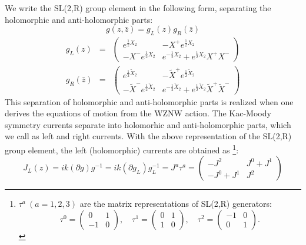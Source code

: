 \documentclass[a4paper,12pt]{article}
\begin{document}
We write the SL(2,R) group element in the following form, separating the
holomorphic and anti-holomorphic parts:
\begin{equation}
g\left( z,\bar{z}\right) =g_{L}\left( z\right) g_{R}\left( \bar{z}\right)
\label{LR}
\end{equation}
\begin{eqnarray}
g_{L}\left( z\right) &=&\left(
\begin{array}{cc}
e^{\frac{1}{2}X_{2}} & -X^{+}e^{\frac{1}{2}X_{2}} \\
-X^{-}e^{\frac{1}{2}X_{2}} & e^{-\frac{1}{2}X_{2}}+e^{\frac{1}{2}%
X_{2}}X^{+}X^{-}
\end{array}
\right)  \label{L} \\
g_{R}\left( \bar{z}\right) &=&\left(
\begin{array}{cc}
e^{\frac{1}{2}\tilde{X}_{2}} & -\tilde{X}^{+}e^{\frac{1}{2}\tilde{X}_{2}} \\
-\tilde{X}^{-}e^{\frac{1}{2}\tilde{X}_{2}} & e^{-\frac{1}{2}\tilde{X}%
_{2}}+e^{\frac{1}{2}\tilde{X}_{2}}\tilde{X}^{+}\tilde{X}^{-}
\end{array}
\right)  \label{R}
\end{eqnarray}
This separation of holomorphic and anti-holomorphic parts is realized when
one derives the equations of motion from the WZNW action. The Kac-Moody
symmetry currents separate into holomorhic and anti-holomorphic parts, which
we call as left and right currents. With the above representation of the
SL(2,R) group element, the left (holomorphic) currents are obtained as%
\footnote{$\tau ^{a}\ (a=1,2,3)$ are the matrix representations of SL(2,R)
generators:$\ $%
\[
\tau ^{0}=\left(
\begin{array}{cc}
0 & 1 \\
-1 & 0
\end{array}
\right) ,\quad \tau ^{1}=\left(
\begin{array}{cc}
0 & 1 \\
1 & 0
\end{array}
\right) ,\quad \tau ^{2}=\left(
\begin{array}{cc}
-1 & 0 \\
0 & 1
\end{array}
\right) .
\]
}:
\begin{equation}
J_{L}\left( z\right) =ik\left( \partial g\right) g^{-1}=ik\left( \partial
g_{L}\right) g_{L}^{-1}=J^{a}\tau ^{a}=\left(
\begin{array}{cc}
-J^{2} & J^{0}+J^{1} \\
-J^{0}+J^{1} & J^{2}
\end{array}
\right)  \label{holocurrent}
\end{equation}
\end{document}
